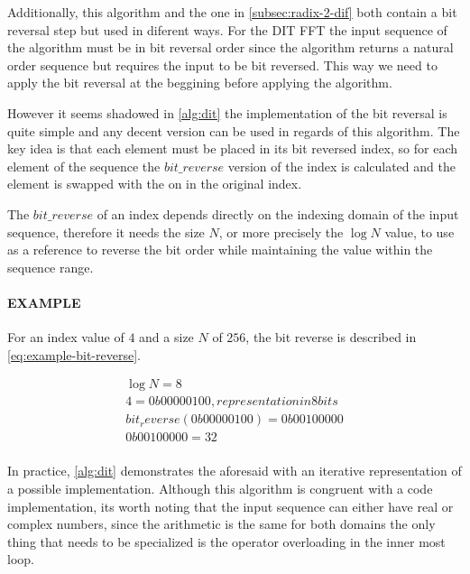 \documentclass[
  oneside,
  11pt, a4paper,
  footinclude=true,
  headinclude=true,
  cleardoublepage=empty
]{scrbook}
\begin{document}
Additionally, this algorithm and the one in \autoref{subsec:radix-2-dif} both contain a bit reversal step but used in diferent ways. For the DIT FFT  the input sequence of the algorithm must be in bit reversal order since the algorithm returns a natural order sequence but requires the input to be bit reversed. This way we need to apply the bit reversal at the beggining before applying the algorithm.

However it seems shadowed in \autoref{alg:dit} the implementation of the bit reversal is quite simple and any decent version can be used in regards of this algorithm. The key idea is that each element must be placed in its bit reversed index, so for each element of the sequence the $bit\_reverse$ version of the index is calculated and the element is swapped with the on in the original index.

The $bit\_reverse$ of an index depends directly on the indexing domain of the input sequence, therefore it needs the size $N$, or more precisely the $\log{N}$ value, to use as a reference to reverse the bit order while maintaining the value within the sequence range.

\paragraph{EXAMPLE} For an index value of $4$ and a size $N$ of $256$, the bit reverse is described in \autoref{eq:example-bit-reverse}. \newline

\begin{equation} \label{eq:example-bit-reverse}
    \begin{aligned}
        \log{N} = 8 \\
        4 = 0b00000100, representation in 8 bits  \\
        bit_reverse(0b00000100) = 0b00100000 \\
        0b00100000 = 32 \\
    \end{aligned}
\end{equation}

In practice, \autoref{alg:dit} demonstrates the aforesaid with an iterative representation of a possible implementation. Although this algorithm is congruent with a code implementation, its worth noting that the input sequence can either have real or complex numbers, since the arithmetic is the same for both domains the only thing that needs to be specialized is the operator overloading in the inner most loop. \newline
\newline
\end{document}
